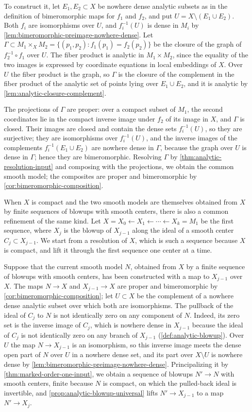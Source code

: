 To construct it, let $E_1,E_2\subset X$ be nowhere dense analytic subsets as in the definition of bimeromorphic maps for $f_1$ and $f_2$, and put $U=X\setminus(E_1\cup E_2)$. Both $f_i$ are isomorphisms over $U$, and $f_i^{-1}(U)$ is dense in $M_i$ by \cref{lem:bimeromorphic-preimage-nowhere-dense}. Let $\Gamma\subset M_1\times_XM_2=\{(p_1,p_2):f_1(p_1)=f_2(p_2)\}$ be the closure of the graph of $f_2^{-1}\circ f_1$ over $U$. The fiber product is analytic in $M_1\times M_2$, since the equality of the two images is expressed by coordinate equations in local embeddings of $X$. Over $U$ the fiber product is the graph, so $\Gamma$ is the closure of the complement in the fiber product of the analytic set of points lying over $E_1\cup E_2$, and it is analytic by \cref{lem:analytic-closure-complement}.

The projections of $\Gamma$ are proper: over a compact subset of $M_1$, the second coordinates lie in the compact inverse image under $f_2$ of its image in $X$, and $\Gamma$ is closed. Their images are closed and contain the dense sets $f_i^{-1}(U)$, so they are surjective; they are isomorphisms over $f_i^{-1}(U)$, and the inverse images of the complements $f_i^{-1}(E_1\cup E_2)$ are nowhere dense in $\Gamma$, because the graph over $U$ is dense in $\Gamma$; hence they are bimeromorphic. Resolving $\Gamma$ by \cref{thm:analytic-resolution-input} and composing with the projections, we obtain the common smooth model; the composites are proper and bimeromorphic by \cref{cor:bimeromorphic-composition}.

When $X$ is compact and the two smooth models are themselves obtained from $X$ by finite sequences of blowups with smooth centers, there is also a common refinement of the same kind. Let $X=X_0\leftarrow X_1\leftarrow\cdots\leftarrow X_k=M_1$ be the first sequence, where $X_j$ is the blowup of $X_{j-1}$ along the ideal of a smooth center $C_j\subset X_{j-1}$. We start from a resolution of $X$, which is such a sequence because $X$ is compact, and lift it through the first sequence one center at a time.

Suppose that the current smooth model $N$, obtained from $X$ by a finite sequence of blowups with smooth centers, has been constructed with a map to $X_{j-1}$ over $X$. The maps $N\to X$ and $X_{j-1}\to X$ are proper and bimeromorphic by \cref{cor:bimeromorphic-composition}; let $U\subset X$ be the complement of a nowhere dense analytic subset over which both are isomorphisms. The pullback of the ideal of $C_j$ to $N$ is not identically zero on any component of $N$. Indeed, its zero set is the inverse image of $C_j$, which is nowhere dense in $X_{j-1}$ because the ideal of $C_j$ is not identically zero on any branch of $X_{j-1}$ (\cref{def:analytic-blowup}). Over $U$ the map $N\to X_{j-1}$ is an isomorphism, so this inverse image meets the dense open part of $N$ over $U$ in a nowhere dense set, and its part over $X\setminus U$ is nowhere dense by \cref{lem:bimeromorphic-preimage-nowhere-dense}. Principalizing it by \cref{thm:marked-order-one-input}, we obtain a sequence of blowups $N'\to N$ with smooth centers, finite because $N$ is compact, on which the pulled-back ideal is invertible, and \cref{prop:analytic-blowup-universal} lifts $N'\to X_{j-1}$ to a map $N'\to X_j$.

